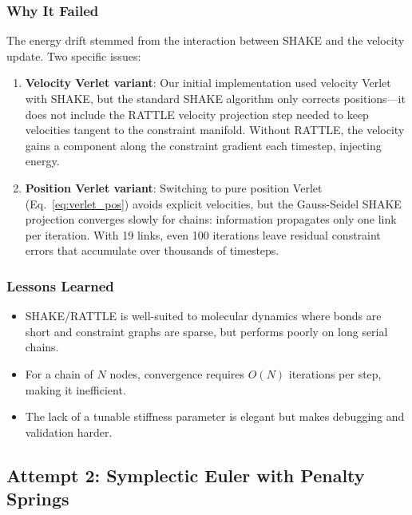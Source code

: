 \documentclass[11pt,a4paper]{article}
\begin{document}
\subsubsection{Why It Failed}

The energy drift stemmed from the interaction between SHAKE and the velocity
update. Two specific issues:

\begin{enumerate}
    \item \textbf{Velocity Verlet variant}: Our initial implementation used
          velocity Verlet with SHAKE, but the standard SHAKE algorithm only
          corrects positions---it does not include the RATTLE velocity
          projection step needed to keep velocities tangent to the
          constraint manifold. Without RATTLE, the velocity gains a
          component along the constraint gradient each timestep, injecting
          energy.
    \item \textbf{Position Verlet variant}: Switching to pure position
          Verlet (Eq.~\ref{eq:verlet_pos}) avoids explicit velocities, but
          the Gauss-Seidel SHAKE projection converges slowly for chains:
          information propagates only one link per iteration. With 19
          links, even 100 iterations leave residual constraint errors that
          accumulate over thousands of timesteps.
\end{enumerate}

\subsubsection{Lessons Learned}

\begin{itemize}
    \item SHAKE/RATTLE is well-suited to molecular dynamics where bonds are
          short and constraint graphs are sparse, but performs poorly on
          long serial chains.
    \item For a chain of $N$ nodes, convergence requires $O(N)$ iterations
          per step, making it inefficient.
    \item The lack of a tunable stiffness parameter is elegant but makes
          debugging and validation harder.
\end{itemize}

\subsection{Attempt 2: Symplectic Euler with Penalty Springs}
\label{sec:symplectic}
\end{document}
